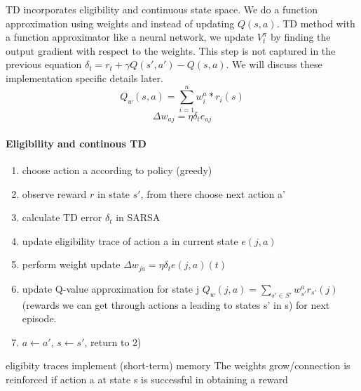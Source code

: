 \documentclass[11pt]{article}
\begin{document}
TD incorporates eligibility and continuous state space. We do a function approximation using weights and instead of updating $Q(s,a)$. 
TD method with a function approximator like a neural network, we update $V_t^\pi$ by finding the output gradient with respect to the weights. This step is not captured in the previous equation $\delta_t = r_{t}+\gamma Q(s',a')-Q(s,a)$. We will discuss these implementation specific details later.
\[
	Q_w(s,a) = \sum_{i=1}^n w_i^a * r_i(s)
\]
\[
	\Delta w_{aj} = \eta \delta_t e_{aj}
\]
\paragraph{Eligibility and continous TD}
\begin{enumerate}
\item choose action a according to policy (greedy)
\item observe reward $r$ in state $s'$, from there choose next action a'
\item calculate TD error $\delta_t$ in SARSA
\item update eligibility trace of action a in current state $e(j,a)$
\item perform weight update $\Delta w_{ja}=\eta \delta_t e(j,a)(t)$
\item update Q-value approximation for state j $Q_w(j,a)=\sum_{s' \in S'}w_{s'}^a r_{s'}(j)$ (rewards we can get through actions a leading to states s' in s) for next episode.
\item $a \leftarrow a'$, $s \leftarrow s'$, return to 2)
\end{enumerate}
eligibity traces implement (short-term) memory
The weights grow/connection is reinforced if action a at state s is successful in obtaining a reward
\end{document}
